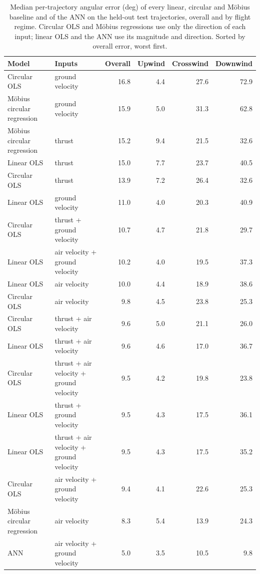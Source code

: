 \begin{table}[h!]
    \centering
    \caption{Median per-trajectory angular error (deg) of every linear, circular and M\"obius baseline and of the ANN on the held-out test trajectories, overall and by flight regime. Circular OLS and M\"obius regressions use only the direction of each input; linear OLS and the ANN use its magnitude and direction. Sorted by overall error, worst first.}
    \label{tab:baseline_regime}
    \begin{tabular}{@{}llrrrr@{}}
        \toprule
        Model & Inputs & Overall & Upwind & Crosswind & Downwind \\
        \midrule
        Circular OLS & ground velocity & 16.8 & 4.4 & 27.6 & 72.9 \\
        Möbius circular regression & ground velocity & 15.9 & 5.0 & 31.3 & 62.8 \\
        Möbius circular regression & thrust & 15.2 & 9.4 & 21.5 & 32.6 \\
        Linear OLS & thrust & 15.0 & 7.7 & 23.7 & 40.5 \\
        Circular OLS & thrust & 13.9 & 7.2 & 26.4 & 32.6 \\
        Linear OLS & ground velocity & 11.0 & 4.0 & 20.3 & 40.9 \\
        Circular OLS & thrust + ground velocity & 10.7 & 4.7 & 21.8 & 29.7 \\
        Linear OLS & air velocity + ground velocity & 10.2 & 4.0 & 19.5 & 37.3 \\
        Linear OLS & air velocity & 10.0 & 4.4 & 18.9 & 38.6 \\
        Circular OLS & air velocity & 9.8 & 4.5 & 23.8 & 25.3 \\
        Circular OLS & thrust + air velocity & 9.6 & 5.0 & 21.1 & 26.0 \\
        Linear OLS & thrust + air velocity & 9.6 & 4.6 & 17.0 & 36.7 \\
        Circular OLS & thrust + air velocity + ground velocity & 9.5 & 4.2 & 19.8 & 23.8 \\
        Linear OLS & thrust + ground velocity & 9.5 & 4.3 & 17.5 & 36.1 \\
        Linear OLS & thrust + air velocity + ground velocity & 9.5 & 4.3 & 17.5 & 35.2 \\
        Circular OLS & air velocity + ground velocity & 9.4 & 4.1 & 22.6 & 25.3 \\
        Möbius circular regression & air velocity & 8.3 & 5.4 & 13.9 & 24.3 \\
        ANN & air velocity + ground velocity & 5.0 & 3.5 & 10.5 & 9.8 \\
        \bottomrule
    \end{tabular}
\end{table}
